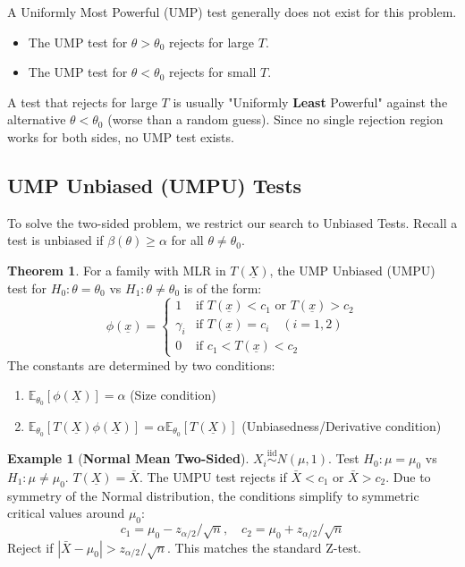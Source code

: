 \documentclass[12pt, a4paper]{article}
\theoremstyle{definition}
\newtheorem{example}{Example}
\newtheorem{theorem}{Theorem}
\newcommand{\E}{\mathbb{E}}
\newcommand{\iid}{\overset{\text{iid}}{\sim}}
\newcommand{\xvec}{\underline{x}}
\newcommand{\Xvec}{\underline{X}}
\begin{document}
A Uniformly Most Powerful (UMP) test generally does not exist for this problem.
\begin{itemize}
    \item The UMP test for $\theta > \theta_0$ rejects for large $T$.
    \item The UMP test for $\theta < \theta_0$ rejects for small $T$.
\end{itemize}
A test that rejects for large $T$ is usually "Uniformly \textbf{Least} Powerful" against the alternative $\theta < \theta_0$ (worse than a random guess). Since no single rejection region works for both sides, no UMP test exists.

\subsection{UMP Unbiased (UMPU) Tests}
To solve the two-sided problem, we restrict our search to Unbiased Tests.
Recall a test is unbiased if $\beta(\theta) \ge \alpha$ for all $\theta \neq \theta_0$.

\begin{theorem}
For a family with MLR in $T(\Xvec)$, the UMP Unbiased (UMPU) test for $H_0: \theta = \theta_0$ vs $H_1: \theta \neq \theta_0$ is of the form:
$$ 
\phi(\xvec) = 
\begin{cases} 
1 & \text{if } T(\xvec) < c_1 \text{ or } T(\xvec) > c_2 \\
\gamma_i & \text{if } T(\xvec) = c_i \quad (i=1,2) \\
0 & \text{if } c_1 < T(\xvec) < c_2
\end{cases}
$$
The constants are determined by two conditions:
\begin{enumerate}
    \item $\E_{\theta_0}[\phi(\Xvec)] = \alpha$ (Size condition)
    \item $\E_{\theta_0}[T(\Xvec) \phi(\Xvec)] = \alpha \E_{\theta_0}[T(\Xvec)]$ (Unbiasedness/Derivative condition)
\end{enumerate}
\end{theorem}

\begin{example}[\textbf{Normal Mean Two-Sided}]
$X_i \iid N(\mu, 1)$. Test $H_0: \mu = \mu_0$ vs $H_1: \mu \neq \mu_0$.
$T(\Xvec) = \bar{X}$.
The UMPU test rejects if $\bar{X} < c_1$ or $\bar{X} > c_2$.
Due to symmetry of the Normal distribution, the conditions simplify to symmetric critical values around $\mu_0$:
$$ c_1 = \mu_0 - z_{\alpha/2}/\sqrt{n}, \quad c_2 = \mu_0 + z_{\alpha/2}/\sqrt{n} $$
Reject if $|\bar{X} - \mu_0| > z_{\alpha/2}/\sqrt{n}$.
This matches the standard Z-test.
\end{example}
\end{document}
